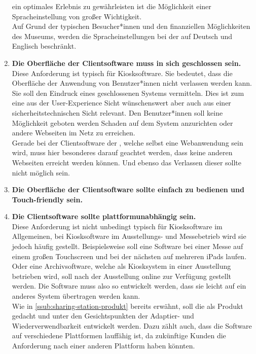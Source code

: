 \begin{enumerate}[label=\textbf{NFA\arabic*}]
  ein optimales Erlebnis zu gewährleisten ist die Möglichkeit einer Spracheinstellung von großer Wichtigkeit.\\
  Auf Grund der typischen Besucher*innen und den finanziellen Möglichkeiten des Museums, werden die 
  Spracheinstellungen bei der \shst{} auf Deutsch und Englisch beschränkt.
  \item\label{nfa4} \textbf{Die Oberfläche der Clientsoftware muss in sich geschlossen sein.}\\
  Diese Anforderung ist typisch für Kiosksoftware. Sie bedeutet, dass die Oberfläche der Anwendung von Benutzer*innen 
  nicht verlassen werden kann. Sie soll den Eindruck eines geschlossenen Systems vermitteln. Dies ist zum eine
  aus der User-Experience Sicht wünschenswert aber auch aus einer sicherheitstechnischen Sicht relevant. Den 
  Benutzer*innen soll keine Möglichkeit geboten werden Schaden auf dem System anzurichten oder andere Webseiten
  im Netz zu erreichen.\\
  Gerade bei der Clientsoftware der \shst{}, welche selbst eine Webanwendung sein wird, muss hier besonderes darauf
  geachtet werden, dass keine anderen Webseiten erreicht werden können. Und ebenso das Verlassen dieser sollte
  nicht möglich sein.
  \item\label{nfa5} \textbf{Die Oberfläche der Clientsoftware sollte einfach zu bedienen und Touch-friendly sein.}\\
  \item\label{nfa6} \textbf{Die Clientsoftware sollte plattformunabhängig sein.}\\
  Diese Anforderung ist nicht unbedingt typisch für Kiosksoftware im Allgemeinen, bei Kiosksoftware im Ausstellungs- und
  Messebetrieb wird sie jedoch häufig gestellt. Beispielsweise soll eine Software bei einer Messe auf einem
  großen Touchscreen und bei der nächsten auf mehreren iPads laufen. Oder eine Archivsoftware, welche als Kiosksystem
  in einer Ausstellung betrieben wird, soll nach der Ausstellung online zur Verfügung gestellt werden. Die Software
  muss also so entwickelt werden, dass sie leicht auf ein anderes System übertragen werden kann. \\ 
  Wie in \autoref{ssub:sharing-station-produkt} bereits erwähnt, soll die \shst{} als Produkt gedacht und
  unter den Gesichtspunkten der Adaptier- und Wiederverwendbarkeit entwickelt werden. Dazu zählt auch, dass die Software
  auf verschiedene Plattformen lauffähig ist, da zukünftige Kunden die Anforderung nach einer anderen Plattform
  haben könnten. 

\end{enumerate}

